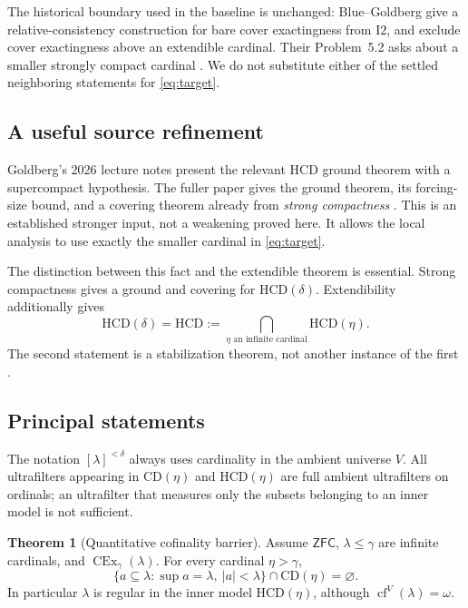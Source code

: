 \documentclass[11pt,letterpaper]{article}
\theoremstyle{definition}
\newtheorem{theorem}[definition]{Theorem}
\newcommand{\ZFC}{\mathsf{ZFC}}
\newcommand{\CEx}{\operatorname{CEx}}
\newcommand{\cf}{\operatorname{cf}}
\newcommand{\Itwo}{\mathrm{I2}}
\newcommand{\CD}{\mathrm{CD}}
\newcommand{\HCD}{\mathrm{HCD}}
\numberwithin{equation}{section}
\begin{document}
The historical boundary used in the baseline is unchanged: Blue--Goldberg give a relative-consistency construction for bare cover exactingness from $\Itwo$, and exclude cover exactingness above an extendible cardinal. Their Problem~5.2 asks about a smaller strongly compact cardinal \cite[Theorems~3.5--3.6, Problem~5.2]{cover}. We do not substitute either of the settled neighboring statements for \eqref{eq:target}.

\subsection{A useful source refinement}

Goldberg's 2026 lecture notes present the relevant HCD ground theorem with a supercompact hypothesis. The fuller paper gives the ground theorem, its forcing-size bound, and a covering theorem already from \emph{strong compactness} \cite[Theorem~4.10, Proposition~4.11, Theorem~4.14]{uniqueness}. This is an established stronger input, not a weakening proved here. It allows the local analysis to use exactly the smaller cardinal in \eqref{eq:target}.

The distinction between this fact and the extendible theorem is essential. Strong compactness gives a ground and covering for $\HCD(\delta)$. Extendibility additionally gives
\[
 \HCD(\delta)=\HCD:=\bigcap_{\eta\text{ an infinite cardinal}}\HCD(\eta).
\]
The second statement is a stabilization theorem, not another instance of the first \cite[Theorem~4.15]{uniqueness}.

\subsection{Principal statements}

The notation $[\lambda]^{<\delta}$ always uses cardinality in the ambient universe $V$. All ultrafilters appearing in $\CD(\eta)$ and $\HCD(\eta)$ are full ambient ultrafilters on ordinals; an ultrafilter that measures only the subsets belonging to an inner model is not sufficient.

\begin{theorem}[Quantitative cofinality barrier]\label{thm:mainbarrier}
Assume $\ZFC$, $\lambda\leq\gamma$ are infinite cardinals, and $\CEx_\gamma(\lambda)$. For every cardinal $\eta>\gamma$,
\begin{equation}\label{eq:barrier}
 \{a\subseteq\lambda:\sup a=\lambda,\ |a|<\lambda\}
       \cap\CD(\eta)=\varnothing.
\end{equation}
In particular $\lambda$ is regular in the inner model $\HCD(\eta)$, although $\cf^V(\lambda)=\omega$.
\end{theorem}
\end{document}

